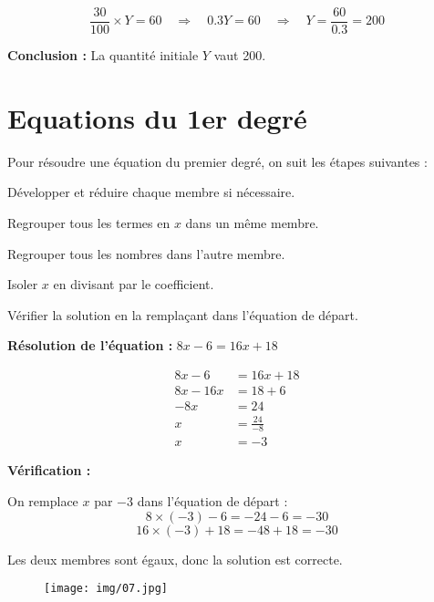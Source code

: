 \documentclass[a4paper,12pt]{article}
\begin{document}
    \[
    \frac{30}{100} \times Y = 60 \quad \Rightarrow \quad 0.3Y = 60 \quad \Rightarrow \quad Y = \frac{60}{0.3} = 200
    \]
    
    \textbf{Conclusion :} La quantité initiale $Y$ vaut 200.
    

  \section*{Equations du 1er degré}

  \begin{tcolorbox}[colback=blue!5!white, colframe=blue!75!black, title=Méthode]
    Pour résoudre une équation du premier degré, on suit les étapes suivantes :
    \begin{compactitem}
        \item Développer et réduire chaque membre si nécessaire.
        \item Regrouper tous les termes en \(x\) dans un même membre.
        \item Regrouper tous les nombres dans l'autre membre.
        \item Isoler \(x\) en divisant par le coefficient.
        \item Vérifier la solution en la remplaçant dans l'équation de départ.
    \end{compactitem}

    \textbf{Résolution de l'équation :} \(8x - 6 = 16x + 18\)
    
    \begin{align*}
    8x - 6 &= 16x + 18 \\
    8x - 16x &= 18 + 6 \\
    -8x &= 24 \\
    x &= \frac{24}{-8} \\
    x &= -3
    \end{align*}
    
    \textbf{Vérification :}
    
    On remplace \(x\) par \(-3\) dans l'équation de départ :
    \[
    8 \times (-3) - 6 = -24 - 6 = -30
    \]
    \[
    16 \times (-3) + 18 = -48 + 18 = -30
    \]
    
    Les deux membres sont égaux, donc la solution est correcte.
    
    \end{tcolorbox}

    \begin{figure}[H]
        \centering
        \texttt{[image: img/07.jpg]}
      \end{figure}
\end{document}
